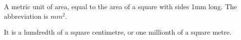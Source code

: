 A metric unit of area, equal to the area of a square with sides 1mm long. The abbreviation is $mm^{2}.$ 
\par
It is a hundredth of a square centimetre, or one millionth of a square metre.